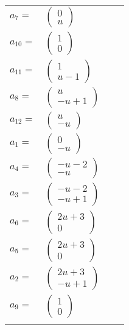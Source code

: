 \documentclass[1p]{elsarticle_modified}
\theoremstyle{definition}
\begin{document}
\begin{tabular}{m{7pt} m{180pt} m{7pt} m{180pt} }
\flushright $a_{7}=$&$\begin{pmatrix}0\\u\end{pmatrix}$ \\
\flushright $a_{10}=$&$\begin{pmatrix}1\\0\end{pmatrix}$ \\
\flushright $a_{11}=$&$\begin{pmatrix}1\\u-1\end{pmatrix}$ \\
\flushright $a_{8}=$&$\begin{pmatrix}u\\- u+1\end{pmatrix}$ \\
\flushright $a_{12}=$&$\begin{pmatrix}u\\- u\end{pmatrix}$ \\
\flushright $a_{1}=$&$\begin{pmatrix}0\\- u\end{pmatrix}$ \\
\flushright $a_{4}=$&$\begin{pmatrix}- u-2\\- u\end{pmatrix}$ \\
\flushright $a_{3}=$&$\begin{pmatrix}- u-2\\- u+1\end{pmatrix}$ \\
\flushright $a_{6}=$&$\begin{pmatrix}2 u+3\\0\end{pmatrix}$ \\
\flushright $a_{5}=$&$\begin{pmatrix}2 u+3\\0\end{pmatrix}$ \\
\flushright $a_{2}=$&$\begin{pmatrix}2 u+3\\- u+1\end{pmatrix}$ \\
\flushright $a_{9}=$&$\begin{pmatrix}1\\0\end{pmatrix}$\\&\end{tabular}
\end{document}
